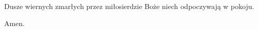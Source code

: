 \rubric{\Vbar}Dusze wiernych zmarłych przez miłosierdzie Boże niech odpoczywają w pokoju.

\rubric{\Rbar}Amen.